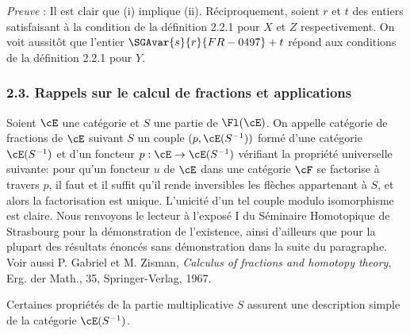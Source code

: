 \emph{Preuve} : Il est clair que (i) implique (ii). Réciproquement, soient $r$ et $t$ des entiers satisfaisant à la condition de la définition 2.2.1 pour $X$ et $Z$ respectivement. On voit aussitôt que l'entier $\SGAvar{s}{r}{FR-0497}+t$ répond aux conditions de la définition 2.2.1 pour $Y$.

\subsubsection*{2.3. Rappels sur le calcul de fractions et applications}
Soient $\cE$ une catégorie et $S$ une partie de $\Fl(\cE)$. On appelle catégorie de fractions de $\cE$ suivant $S$ un couple $(p,\cE(S^{-1}))$ formé d'une catégorie $\cE(S^{-1})$ et d'un foncteur $p:\cE\to\cE(S^{-1})$ vérifiant la propriété universelle suivante: pour qu'un foncteur $u$ de $\cE$ dans une catégorie $\cF$ se factorise à travers $p$, il faut et il suffit qu'il rende inversibles les flèches appartenant à $S$, et alors la factorisation est unique. L'unicité d'un tel couple modulo isomorphisme est claire. Nous renvoyons le lecteur à l'exposé I du Séminaire Homotopique de Strasbourg pour la démonstration de l'existence, ainsi d'ailleurs que pour la plupart des résultats énoncés sans démonstration dans la suite du paragraphe. Voir aussi P. Gabriel et M. Zisman, \emph{Calculus of fractions and homotopy theory}, Erg. der Math., 35, Springer-Verlag, 1967.

Certaines propriétés de la partie multiplicative $S$ assurent une description simple de la catégorie $\cE(S^{-1})$.

